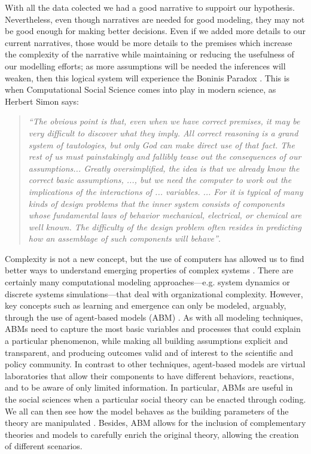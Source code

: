 \documentclass{article}
\begin{document}
With all the data colected we had a good narrative to suppoirt our hypothesis. Nevertheless, even though narratives are needed for good modeling, they may not be good enough for making better decisions. Even if we added more details to our current narratives, those would be more details to the premises which increase the complexity of the narrative while maintaining or reducing the usefulness of our modelling efforts; as more assumptions will be needed the inferences will weaken, then this logical system will experience the Bonini\textquotesingle s Paradox \cite{bonini_simulation_1963}. This is when Computational Social Science comes into play in modern science, as Herbert Simon says:
\begin{quote}
\emph{``The obvious point is that, even when we have correct premises, it may be very difficult to discover what they imply. All correct reasoning is a grand system of tautologies, but only God can make direct use of that fact. The rest of us must painstakingly and fallibly tease out the consequences of our assumptions... Greatly oversimplified, the idea is that we already know the correct basic assumptions, ..., but we need the computer to work out the implications of the interactions of ... variables. ... For it is typical of many kinds of design problems that the inner system consists of components whose fundamental laws of behavior mechanical, electrical, or chemical are well known. The difficulty of the design problem often resides in predicting how an assemblage of such components will behave''}\cite{simon_sciences_1996}.
\end{quote}
Complexity is not a new concept, but the use of computers has allowed us to find better ways to understand emerging properties of complex systems \cite{simon_sciences_1996}. There are certainly many computational modeling approaches---e.g. system dynamics or discrete systems simulations---that deal with organizational complexity. However, key concepts such as learning and emergence can only be modeled, arguably, through the use of agent-based models (ABM) \cite{cioffi-revilla_introduction_2014,miller_complex_2007,gilbert_simulation_2005,epstein_growing_1996}. As with all modeling techniques, ABMs need to capture the most basic variables and processes that could explain a particular phenomenon, while making all building assumptions explicit and transparent, and producing outcomes valid and of interest to the scientific and policy community. In contrast to other techniques, agent-based models are virtual laboratories that allow their components to have different behaviors, reactions, and to be aware of only limited information. In particular, ABMs are useful in the social sciences when a particular social theory can be enacted through coding. We all can then see how the model behaves as the building parameters of the theory are manipulated \cite{miller_complex_2007,epstein_growing_1996}. Besides, ABM allows for the inclusion of complementary theories and models to carefully enrich the original theory, allowing the creation of different scenarios.
\end{document}
